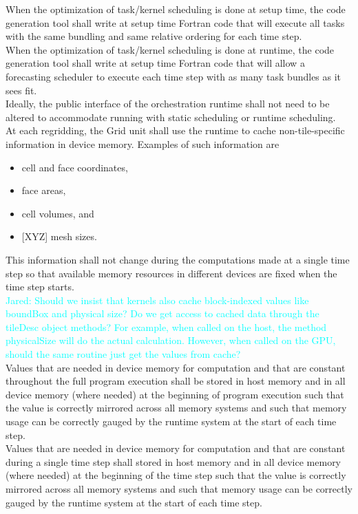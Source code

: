 \documentclass{article}
\newcommand{\Jared}[1]          {\textcolor{cyan}{Jared: #1}}
\begin{document}
When the optimization of task/kernel scheduling is done at setup time, the 
code generation tool shall write at setup time Fortran code that will execute
all tasks with the same bundling and same relative ordering for each time
step.\\

When the optimization of task/kernel scheduling is done at runtime, the 
code generation tool shall write at setup time Fortran code that will allow a
forecasting scheduler to execute each time step with as many task bundles as it
sees fit.\\

Ideally, the public interface of the orchestration runtime shall not need to be
altered to accommodate running with static scheduling or runtime scheduling.\\

At each regridding, the Grid unit shall use the runtime to cache
non-tile-specific information in device memory.  Examples of such information
are
\begin{itemize}
\item{cell and face coordinates,}
\item{face areas, }
\item{cell volumes, and}
\item{[XYZ] mesh sizes.}
\end{itemize}
This information shall not change during the computations made at a single time
step so that available memory resources in different devices are fixed when the
time step starts.\\

\Jared{Should we insist that kernels also cache block-indexed values
like boundBox and physical size?  Do we get access to cached data through the
tileDesc object methods?  For example, when called on the host, the method
physicalSize will do the actual calculation.  However, when called on the GPU,
should the same routine just get the values from cache?}\\

Values that are needed in device memory for computation and that are constant
throughout the full program execution shall be stored in host memory and in all
device memory (where needed) at the beginning of program execution such that the
value is correctly mirrored across all memory systems and such that memory
usage can be correctly gauged by the runtime system at the start of each time
step.\\

Values that are needed in device memory for computation and that are constant
during a single time step shall stored in host memory and in all device memory
(where needed) at the beginning of the time step such that the value is
correctly mirrored across all memory systems and such that memory usage can be
correctly gauged by the runtime system at the start of each time step.
\end{document}
